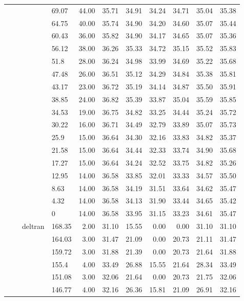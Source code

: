 \begin{longtable}{llllrrrrrrr}
   &  &  & 69.07 & 44.00 & 35.71 & 34.91 & 34.24 & 34.71 & 35.04 & 35.38 \\ 
   &  &  & 64.75 & 40.00 & 35.74 & 34.90 & 34.20 & 34.60 & 35.07 & 35.44 \\ 
   &  &  & 60.43 & 36.00 & 35.82 & 34.90 & 34.17 & 34.65 & 35.07 & 35.36 \\ 
   &  &  & 56.12 & 38.00 & 36.26 & 35.33 & 34.72 & 35.15 & 35.52 & 35.83 \\ 
   &  &  & 51.8 & 28.00 & 36.24 & 34.98 & 33.99 & 34.69 & 35.22 & 35.68 \\ 
   &  &  & 47.48 & 26.00 & 36.51 & 35.12 & 34.29 & 34.84 & 35.38 & 35.81 \\ 
   &  &  & 43.17 & 23.00 & 36.72 & 35.19 & 34.14 & 34.87 & 35.50 & 35.91 \\ 
   &  &  & 38.85 & 24.00 & 36.82 & 35.39 & 33.87 & 35.04 & 35.59 & 35.85 \\ 
   &  &  & 34.53 & 19.00 & 36.75 & 34.82 & 33.25 & 34.44 & 35.24 & 35.72 \\ 
   &  &  & 30.22 & 16.00 & 36.71 & 34.49 & 32.79 & 33.89 & 35.07 & 35.73 \\ 
   &  &  & 25.9 & 15.00 & 36.64 & 34.30 & 32.16 & 33.83 & 34.82 & 35.37 \\ 
   &  &  & 21.58 & 15.00 & 36.64 & 34.44 & 32.33 & 33.74 & 34.90 & 35.68 \\ 
   &  &  & 17.27 & 15.00 & 36.64 & 34.24 & 32.52 & 33.75 & 34.82 & 35.26 \\ 
   &  &  & 12.95 & 14.00 & 36.58 & 33.85 & 32.01 & 33.33 & 34.57 & 35.50 \\ 
   &  &  & 8.63 & 14.00 & 36.58 & 34.19 & 31.51 & 33.64 & 34.62 & 35.47 \\ 
   &  &  & 4.32 & 14.00 & 36.58 & 34.13 & 31.90 & 33.44 & 34.65 & 35.42 \\ 
   &  &  & 0 & 14.00 & 36.58 & 33.95 & 31.15 & 33.23 & 34.61 & 35.47 \\ 
   &  & deltran & 168.35 & 2.00 & 31.10 & 15.55 & 0.00 & 0.00 & 31.10 & 31.10 \\ 
   &  &  & 164.03 & 3.00 & 31.47 & 21.09 & 0.00 & 20.73 & 21.11 & 31.47 \\ 
   &  &  & 159.72 & 3.00 & 31.88 & 21.39 & 0.00 & 20.73 & 21.64 & 31.88 \\ 
   &  &  & 155.4 & 4.00 & 33.49 & 26.88 & 15.55 & 21.64 & 28.34 & 33.49 \\ 
   &  &  & 151.08 & 3.00 & 32.06 & 21.64 & 0.00 & 20.73 & 21.75 & 32.06 \\ 
   &  &  & 146.77 & 4.00 & 32.16 & 26.36 & 15.81 & 21.09 & 26.91 & 32.16 \\ 

\end{longtable}
